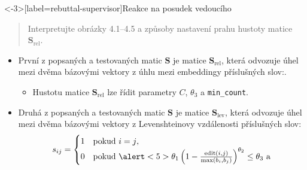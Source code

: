 \documentclass[aspectratio=169,t]{beamer}
\begin{document}
\begin{frame}<-3>[label=rebuttal-supervisor]{Reakce na posudek vedoucího}
\vspace*{-.1cm}
\begin{quote}
\alert<1>{Interpretujte obrázky 4.1--4.5} a způsoby nastavení prahu
\alert<1>{hustoty matice $\mathbf{S}_{\text{rel}}$}.
\end{quote}
\vspace*{-.1cm}
\begin{itemize}
  \item<2-> První z popsaných a testovaných matic $\mathbf S$ je \alert<2>{matice
    $\mathbf{S}_{\text{rel}}$}, která \alert<2>{odvozuje úhel mezi dvěma
    bázovými vektory z úhlu mezi embeddingy příslušných slov}:.
    \begin{itemize}
      \item<3-> \alert<3>{Hustotu} matice $\mathbf{S}_{\text{rel}}$ \alert<3>{lze
        řídit parametry $C$, $\theta_3$ a \texttt{min\_count}}.
    \end{itemize}
  \item<4-> Druhá z popsaných a testovaných matic $\mathbf S$ je \alert<4>{matice
    $\mathbf{S}_{\text{lev}}$}, která \alert<4>{odvozuje úhel mezi dvěma
    bázovými vektory z Levenshteinovy vzdálenosti příslušných slov}:
    \begin{equation*}
      s_{ij} = \begin{cases}
        1 & \text{pokud }i = j\text{,} \\
        0 & \text{pokud }\alert<5>{\theta_1\left(1-\frac{\operatorname{edit}(i, j)}{\max(b_i, b_j)}\right)^{\theta_2}\leq\theta_3}\text{ a} \\

\end{cases}
\end{equation*}
\end{itemize}
\end{frame}
\end{document}
